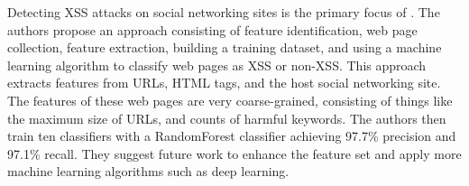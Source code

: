 Detecting XSS attacks on social networking sites is the primary focus of \cite{rathore2017xss}.  The authors propose an approach consisting of feature identification, web page collection, feature extraction, building a training dataset, and using a machine learning algorithm to classify web pages as XSS or non-XSS.  This approach extracts features from URLs, HTML tags, and the host social networking site.  The features of these web pages are very coarse-grained, consisting of things like the maximum size of URLs, and counts of harmful keywords.  The authors then train ten classifiers with a RandomForest classifier achieving 97.7\% precision and 97.1\% recall.  They suggest future work to enhance the feature set and apply more machine learning algorithms such as deep learning.